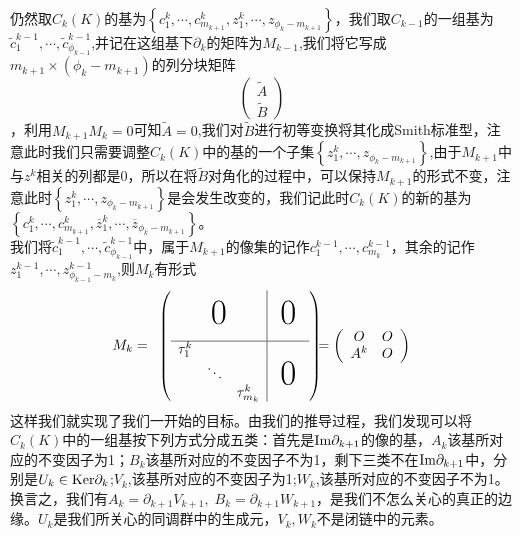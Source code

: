 仍然取$C_{k}(K)$的基为$\left\{{c_{1}^{k},\cdots,c_{m_{k+1}}^{k},z_{1}^{k},\cdots,z_{\phi_{k}-m_{k+1}}}\right\}$，我们取$C_{k-1}$的一组基为$\tilde{c}_{1}^{k-1},\cdots,\tilde{c}_{\phi_{k-1}}^{k-1}$,并记在这组基下$\partial_{k}$的矩阵为$M_{k-1}$,我们将它写成$m_{k+1}\times(\phi_{k}-m_{k+1})$的列分块矩阵
\begin{equation*}
    \left(\begin{array}{c}
         \tilde{A}  \\
          \tilde{B}
    \end{array}\right)
\end{equation*}
，利用$M_{k+1}M_{k}=0$可知$\tilde{A}=0$,我们对$\tilde{B}$进行初等变换将其化成Smith标准型，注意此时我们只需要调整$C_{k}(K)$中的基的一个子集$\left\{{z_{1}^{k},\cdots,z_{\phi_{k}-m_{k+1}}}\right\}$,由于$M_{k+1}$中与$z^{k}$相关的列都是0，所以在将$\tilde{B}$对角化的过程中，可以保持$M_{k+1}$的形式不变，注意此时$\left\{{z_{1}^{k},\cdots,z_{\phi_{k}-m_{k+1}}}\right\}$是会发生改变的，我们记此时$C_{k}(K)$的新的基为$\left\{{c_{1}^{k},\cdots,c_{m_{k+1}}^{k},\overline{z}_{1}^{k},\cdots,\overline{z}_{\phi_{k}-m_{k+1}}}\right\}$。\\
我们将$\tilde{c}_{1}^{k-1},\cdots,\tilde{c}_{\phi_{k-1}}^{k-1}$中，属于$M_{k+1}$的像集的记作$c_{1}^{k-1},\cdots,c_{m_{k}}^{k-1}$，其余的记作$z_{1}^{k-1},\cdots,z_{\phi_{k-1}-m_{k}}^{k-1}$,则$M_{k}$有形式
\begin{equation*}
	M_{k}=\begin{array}{c@{\hspace{-5pt}}l}	
	\left(\begin{array}{ccc|ccc}
		& & & & & \\	
	& & & & & \\	
	\multicolumn{3}{c|}{\raisebox{2ex}[0pt]{\Huge0}}
	& 	\multicolumn{3}{c}{\raisebox{2ex}[0pt]{\Huge0}}	\\\hline
	\tau^{k}_{1}& & & & &\\	
	&\ddots & & & \\	
	& &\tau^{k}_{m_{k}}& \multicolumn{3}{c}{\raisebox{2ex}[0pt]{\Huge0}}
	\end{array}\right)
	\end{array}=\left(\begin{array}{cc}
	    O & O \\
	    A^{k} & O 
	\end{array}\right)
	\end{equation*}
这样我们就实现了我们一开始的目标。由我们的推导过程，我们发现可以将$C_{k}(K)$中的一组基按下列方式分成五类：首先是${\rm Im}\partial_{k+1}$的像的基，$A_{k}$该基所对应的不变因子为1；$B_{k}$该基所对应的不变因子不为1，剩下三类不在${\rm Im}\partial_{k+1}$中，分别是$U_{k}\in{\rm Ker}\partial_{k}$;$V_{k}$,该基所对应的不变因子为1;$W_{k}$,该基所对应的不变因子不为1。换言之，我们有$A_{k}=\partial_{k+1}V_{k+1},\;B_{k}=\partial_{k+1}W_{k+1}$，是我们不怎么关心的真正的边缘。$U_{k}$是我们所关心的同调群中的生成元，$V_{k},W_{k}$不是闭链中的元素。\\
